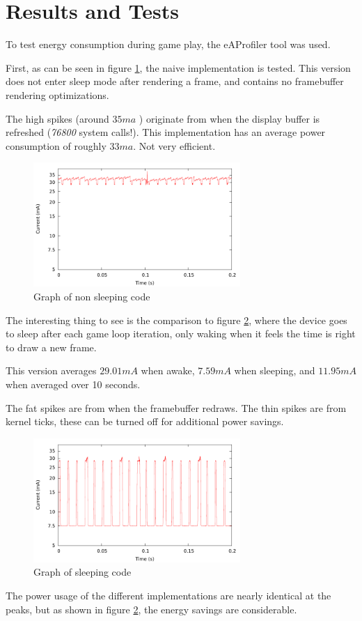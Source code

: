 \section{Results and Tests}
To test energy consumption during game play, the eAProfiler tool was used.

First, as can be seen in figure \ref{fig:nosleep},
the naive implementation is tested.
This version does not enter sleep mode after rendering a frame,
and contains no framebuffer rendering optimizations.

The high spikes (around $ 35 ma $ ) originate from when the
display buffer is refreshed (\emph{76800} system calls!). This implementation has an average
power consumption of roughly $ 33 ma $. Not very efficient.

\begin{figure}[H]
\centering
\includegraphics[width=0.7\textwidth]{figures/nosleep.pdf}
\caption{Graph of non sleeping code}
\label{fig:nosleep}
\end{figure}

The interesting thing to see is the comparison to figure
\ref{fig:sleep}, where the device goes to sleep after each
game loop iteration, only waking when it feels the time is
right to draw a new frame.

This version averages $ 29.01 mA $ when awake,
$ 7.59 mA $ when sleeping,
and $ 11.95 mA $ when averaged over 10 seconds.

The fat spikes are from when the framebuffer redraws.
The thin spikes are from kernel ticks,
these can be turned off for additional power savings.

\begin{figure}[H]
\centering
\includegraphics[width=0.7\textwidth]{figures/sleep.pdf}
\caption{Graph of sleeping code}
\label{fig:sleep}
\end{figure}

The power usage of the different implementations are nearly identical at the
peaks, but as shown in figure \ref{fig:sleep}, the energy savings are considerable.
